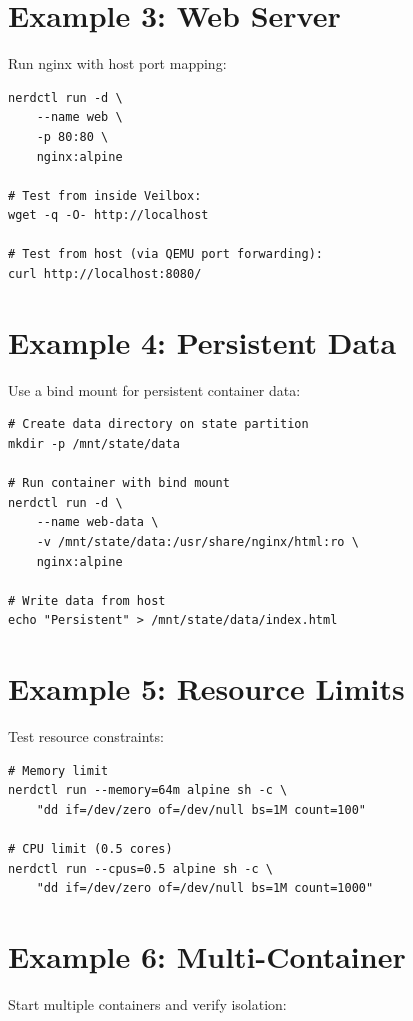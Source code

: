 \section{Example 3: Web Server}

Run nginx with host port mapping:

\begin{lstlisting}
nerdctl run -d \
    --name web \
    -p 80:80 \
    nginx:alpine

# Test from inside Veilbox:
wget -q -O- http://localhost

# Test from host (via QEMU port forwarding):
curl http://localhost:8080/
\end{lstlisting}

\section{Example 4: Persistent Data}

Use a bind mount for persistent container data:

\begin{lstlisting}
# Create data directory on state partition
mkdir -p /mnt/state/data

# Run container with bind mount
nerdctl run -d \
    --name web-data \
    -v /mnt/state/data:/usr/share/nginx/html:ro \
    nginx:alpine

# Write data from host
echo "Persistent" > /mnt/state/data/index.html
\end{lstlisting}

\section{Example 5: Resource Limits}

Test resource constraints:

\begin{lstlisting}
# Memory limit
nerdctl run --memory=64m alpine sh -c \
    "dd if=/dev/zero of=/dev/null bs=1M count=100"

# CPU limit (0.5 cores)
nerdctl run --cpus=0.5 alpine sh -c \
    "dd if=/dev/zero of=/dev/null bs=1M count=1000"
\end{lstlisting}

\section{Example 6: Multi-Container}

Start multiple containers and verify isolation:

